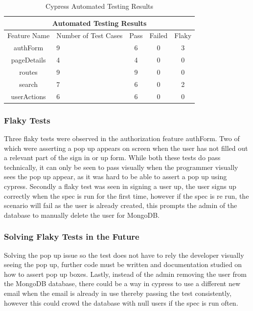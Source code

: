 \begin{table}
\centering
    \begin{tabular}{|c|p{3cm}|c|c|c|}
    \hline
    \multicolumn{5}{|c|}{Automated Testing Results} \\
    \hline
    Feature Name & Number of Test Cases & Pass & Failed & Flaky \\
    \hline
    \hline
        authForm & 9 & 6 & 0 & 3 \\
        pageDetails & 4 & 4 & 0 & 0 \\
        routes & 9 & 9 & 0 & 0 \\
        search & 7 & 6 & 0 & 2 \\
        userActions & 6 & 6 & 0 & 0 \\
    \hline
    \end{tabular}
\caption{Cypress Automated Testing Results}
\label{table:CyAutoResults}
\end{table}

\subsubsection{Flaky Tests}\label{Flaky}
Three flaky tests were observed in the authorization feature authForm. Two of which were asserting a pop up appears on screen when the user has not filled out a relevant part of the sign in or up form. While both these tests do pass technically, it can only be seen to pass visually when the programmer visually sees the pop up appear, as it was hard to be able to assert a pop up using cypress. Secondly a flaky test was seen in signing a user up, the user signs up correctly when the spec is run for the first time, however if the spec is re run, the scenario will fail as the user is already created, this prompts the admin of the database to manually delete the user for MongoDB.

\subsubsection{Solving Flaky Tests in the Future}\label{SolveFlaky}
Solving the pop up issue so the test does not have to rely the developer visually seeing the pop up, further code must be written and documentation studied on how to assert pop up boxes. Lastly, instead of the admin removing the user from the MongoDB database, there could be a way in cypress to use a different new email when the email is already in use thereby passing the test consistently, however this could crowd the database with null users if the spec is run often.

